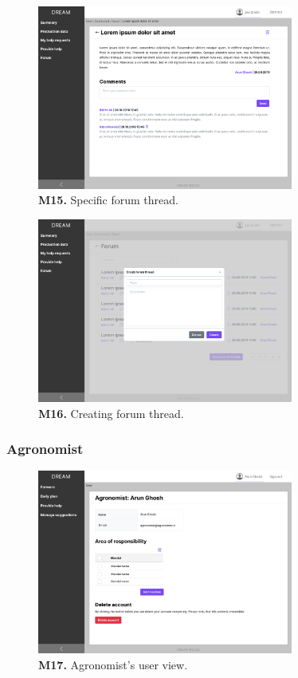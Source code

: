 \begin{figure}[H]
    \centering
    \includegraphics[width=0.75\textwidth]{mockups/Farmer_Dashboard_Forum_Thread.png}
    \caption{\textbf{M15.} Specific forum thread.}
\end{figure}

\begin{figure}[H]
    \centering
    \includegraphics[width=0.75\textwidth]{mockups/Farmer_Dashboard_Forum_Create thread.png}
    \caption{\textbf{M16.} Creating forum thread.}
\end{figure}


\subsubsection{Agronomist}

\begin{figure}[H]
    \centering
    \includegraphics[width=0.75\textwidth]{mockups/Agronomist_User.png}
    \caption{\textbf{M17.} Agronomist's user view.}
\end{figure}

